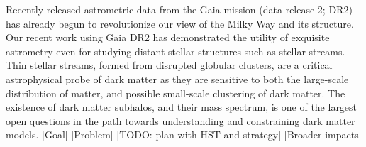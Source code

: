 \documentclass[12pt]{article}
\begin{document}
Recently-released astrometric data from the Gaia mission (data release 2; DR2) has already begun to revolutionize our view of the Milky Way and its structure.
Our recent work using Gaia DR2 has demonstrated the utility of exquisite astrometry even for studying distant stellar structures such as stellar streams.
Thin stellar streams, formed from disrupted globular clusters, are a critical astrophysical probe of dark matter as they are sensitive to both the large-scale distribution of matter, and possible small-scale clustering of dark matter.
The existence of dark matter subhalos, and their mass spectrum, is one of the largest open questions in the path towards understanding and constraining dark matter models.
[Goal]
[Problem]
[TODO: plan with HST and strategy]
[Broader impacts]
\end{document}
